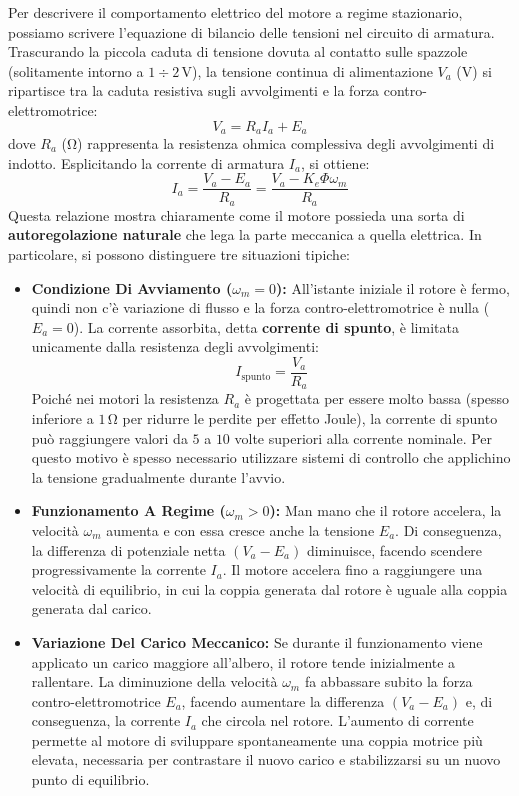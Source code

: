 ﻿\documentclass[11pt, a4paper]{article}
\begin{document}
Per descrivere il comportamento elettrico del motore a regime stazionario, possiamo scrivere l'equazione di bilancio delle tensioni nel circuito di armatura. Trascurando la piccola caduta di tensione dovuta al contatto sulle spazzole (solitamente intorno a $1 \div 2\,\si{\volt}$), la tensione continua di alimentazione $V_a$ ($\si{\volt}$) si ripartisce tra la caduta resistiva sugli avvolgimenti e la forza contro-elettromotrice:
\[
    V_a = R_a I_a + E_a
\]
dove $R_a$ ($\si{\ohm}$) rappresenta la resistenza ohmica complessiva degli avvolgimenti di indotto. Esplicitando la corrente di armatura $I_a$, si ottiene:
\[
    \boxed{I_a = \frac{V_a - E_a}{R_a} = \frac{V_a - K_e \Phi \omega_m}{R_a}}
\]
Questa relazione mostra chiaramente come il motore possieda una sorta di \textbf{autoregolazione naturale} che lega la parte meccanica a quella elettrica. In particolare, si possono distinguere tre situazioni tipiche:
\begin{itemize}
    \item \textbf{Condizione Di Avviamento ($\omega_m = 0$):} All'istante iniziale il rotore è fermo, quindi non c'è variazione di flusso e la forza contro-elettromotrice è nulla ($E_a = 0$). La corrente assorbita, detta \textbf{corrente di spunto}, è limitata unicamente dalla resistenza degli avvolgimenti:
    \[
        I_{\text{spunto}} = \frac{V_a}{R_a}
    \]
    Poiché nei motori la resistenza $R_a$ è progettata per essere molto bassa (spesso inferiore a $1\,\si{\ohm}$ per ridurre le perdite per effetto Joule), la corrente di spunto può raggiungere valori da $5$ a $10$ volte superiori alla corrente nominale. Per questo motivo è spesso necessario utilizzare sistemi di controllo che applichino la tensione gradualmente durante l'avvio.

    \item \textbf{Funzionamento A Regime ($\omega_m > 0$):} Man mano che il rotore accelera, la velocità $\omega_m$ aumenta e con essa cresce anche la tensione $E_a$. Di conseguenza, la differenza di potenziale netta $(V_a - E_a)$ diminuisce, facendo scendere progressivamente la corrente $I_a$. Il motore accelera fino a raggiungere una velocità di equilibrio, in cui la coppia generata dal rotore è uguale alla coppia generata dal carico.

    \item \textbf{Variazione Del Carico Meccanico:} Se durante il funzionamento viene applicato un carico maggiore all'albero, il rotore tende inizialmente a rallentare. La diminuzione della velocità $\omega_m$ fa abbassare subito la forza contro-elettromotrice $E_a$, facendo aumentare la differenza $(V_a - E_a)$ e, di conseguenza, la corrente $I_a$ che circola nel rotore. L'aumento di corrente permette al motore di sviluppare spontaneamente una coppia motrice più elevata, necessaria per contrastare il nuovo carico e stabilizzarsi su un nuovo punto di equilibrio.
\end{itemize}
\end{document}
